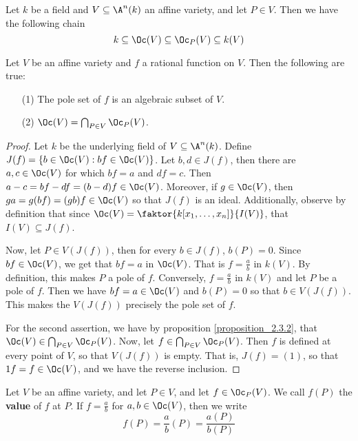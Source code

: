 \begin{proposition}\label{proposition_2.3.2}
  Let $k$ be a field and  $V \subseteq \A^n(k)$ an affine variety, and
  let $P \in V$. Then we have the following chain
  \begin{equation*}
    k \subseteq \Oc(V) \subseteq \Oc_P(V) \subseteq k(V)
  \end{equation*}
\end{proposition}

\begin{proposition}\label{proposition_2.3.3}
  Let $V$ be an affine variety and  $f$ a rational function on  $V$.
  Then the following are true:
  \begin{enumerate}
    \item[(1)] The pole set of $f$ is an algebraic subset of $V$.

    \item[(2)] $\Oc(V)=\bigcap_{P \in V}{\Oc_P(V)}$.
  \end{enumerate}
\end{proposition}
\begin{proof}
  Let $k$ be the underlying field of  $V \subseteq \A^n(k)$. Define
  $J(f)=\{ b \in \Oc(V) : bf \in \Oc(V) \}$. Let $b,d \in J(f)$,
  then there are $a,c \in \Oc(V)$ for which $bf=a$ and $df=c$.
  Then $a-c=bf-df=(b-d)f \in \Oc(V)$. Moreover, if $g \in \Oc(V)$,
  then $ga=g(bf)=(gb)f \in \Oc(V)$ so that $J(f)$ is an ideal.
  Additionally, observe by definition that since
  $\Oc(V)=\faktor{k[x_1, \dots, x_n]}{I(V)}$, that $I(V) \subseteq
  J(f)$.

  Now, let $P \in V(J(f))$, then for every $b \in J(f)$, $b(P)=0$.
  Since $bf \in \Oc(V)$, we get that $bf=a$ in $\Oc(V)$. That is
  $f=\frac{a}{b}$ in $k(V)$. By definition, this makes $P$ a pole of
  $f$. Conversely, $f=\frac{a}{b}$ in $k(V)$ and let $P$ be a pole of
   $f$. Then we have $bf=a \in \Oc(V)$ and $b(P)=0$ so that $b \in
   V(J(f))$. This makes the $V(J(f))$ precisely the pole set of $f$.

   For the second assertion, we have by proposition \ref{proposition_2.3.2}, that
   $\Oc(V) \in \bigcap_{P \in V}{\Oc_P(V)}$. Now, let $f \in
   \bigcap_{P \in V}{\Oc_P(V)}$. Then $f$ is defined at every point of
   $V$, so that  $V(J(f))$ is empty. That is, $J(f)=(1)$, so that
   $1f=f \in \Oc(V)$, and we have the reverse inclusion.
\end{proof}

\begin{definition}
  Let $V$ be an affine variety, and let $P \in V$, and let $f \in
  \Oc_P(V)$. We call $f(P)$ the \textbf{value} of $f$ at $P$. If
  $f=\frac{a}{b}$ for $a,b \in \Oc(V)$, then we write
  \begin{equation*}
    f(P)=\frac{a}{b}(P)=\frac{a(P)}{b(P)}
  \end{equation*}
\end{definition}

